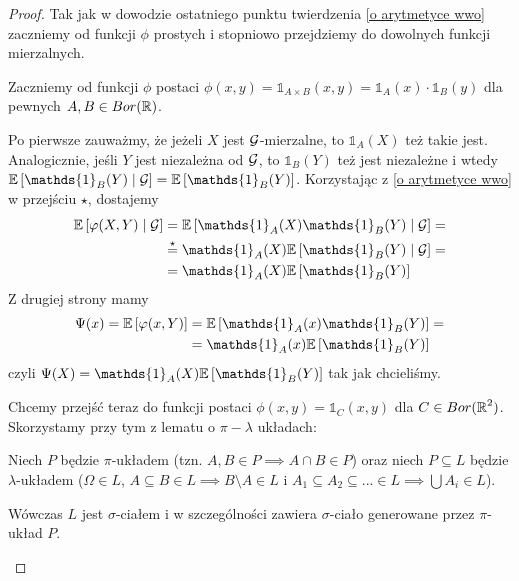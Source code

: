 \begin{proof}

  Tak jak w dowodzie ostatniego punktu twierdzenia \ref{o arytmetyce wwo} zaczniemy od funkcji $\phi$ prostych i stopniowo przejdziemy do dowolnych funkcji mierzalnych. 

  Zaczniemy od funkcji $\phi$ postaci $\phi(x, y)=\mathds{1}_{A\times B}(x, y)=\mathds{1}_A(x)\cdot\mathds{1}_B(y)$ dla pewnych $A, B\in Bor(\operatorname{\mathbb{R}})$.

  Po pierwsze zauważmy, że jeżeli $X$ jest $\mathcal{G}$-mierzalne, to $\mathds{1}_A(X)$ też takie jest. Analogicznie, jeśli $Y$ jest niezależna od $\mathcal{G}$, to $\mathds{1}_B(Y)$ też jest niezależne i wtedy $\expected{\mathds{1}_B(Y)}{\set{G}}=\expected{\mathds{1}_B(Y)}$. Korzystając z \ref{o arytmetyce wwo} w przejściu $\star$, dostajemy
  \begin{align*}
    \expected{\phi(X, Y)}{\set{G}}&=\expected{\mathds{1}_A(X)\mathds{1}_B(Y)}{\set{G}}=\\ 
                                  &\overset{\star}{=}\mathds{1}_A(X)\expected{\mathds{1}_B(Y)}{\set{G}}=\\ 
                                  &=\mathds{1}_A(X)\expected{\mathds{1}_B(Y)}
  \end{align*}
  Z drugiej strony mamy
  \begin{align*}
    \Psi(x)=\expected{\phi(x, Y)}&=\expected{\mathds{1}_A(x)\mathds{1}_B(Y)}=\\ 
                                &=\mathds{1}_A(x)\expected{\mathds{1}_B(Y)}
  \end{align*}
  czyli $\Psi(X)=\mathds{1}_A(X)\expected{\mathds{1}_B(Y)}$ tak jak chcieliśmy.

  Chcemy przejść teraz do funkcji postaci $\phi(x, y)=\mathds{1}_C(x, y)$ dla $C\in Bor(\operatorname{\mathbb{R}}^2)$. Skorzystamy przy tym z lematu o $\pi-\lambda$ układach:

  \begin{dygresja}
    Niech $P$ będzie $\pi$-układem (tzn. $A, B\in P\implies A\cap B\in P$) oraz niech $P\subseteq L$ będzie $\lambda$-układem ($\Omega\in L$, $A\subseteq B\in L\implies B\setminus A\in L$ i $A_1\subseteq A_2\subseteq...\in L\implies \bigcup A_i\in L$). 

    Wówczas $L$ jest $\sigma$-ciałem i w szczególności zawiera $\sigma$-ciało generowane przez $\pi$-układ $P$.
  \end{dygresja}


\end{proof}
